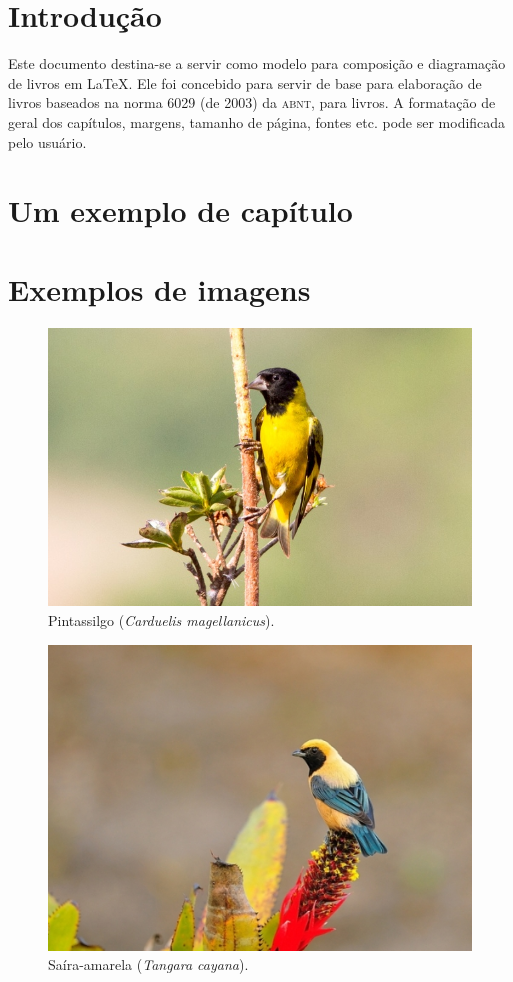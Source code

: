 \documentclass[11pt,a5paper]{memoir}
\begin{document}
\frontmatter

\tableofcontents*
\cleardoublepage

\listoffigures*
\cleardoublepage

\listoftables*
\cleardoublepage

\mainmatter

\chapter*{Introdução}
Este documento destina-se a servir como modelo para composição e diagramação de livros em \LaTeX. Ele foi concebido para servir de base para elaboração de livros baseados na norma 6029 (de 2003) da \textsc{abnt}, para livros. A formatação de geral dos capítulos, margens, tamanho de página, fontes etc. pode ser modificada pelo usuário.


\chapter{Um exemplo de capítulo}

\chapter{Exemplos de imagens}

\begin{figure}
\centering
\includegraphics[width=0.6\linewidth]{pintassilgo}
\caption{Pintassilgo (\textit{Carduelis magellanicus}).}
\label{fig:pintassilgo}
\end{figure}


\begin{figure}
\centering
\includegraphics[width=0.6\linewidth]{saira-amarela}
\caption{Saíra-amarela (\textit{Tangara cayana}).}
\label{fig:saira-amarela}
\end{figure}
\end{document}
